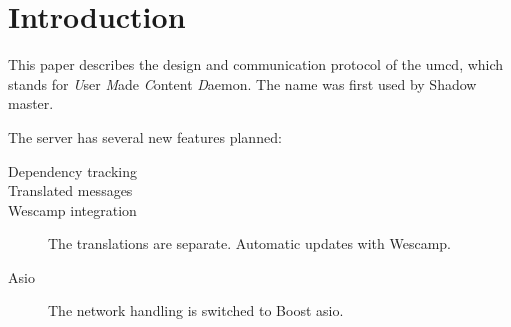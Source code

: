 \chapter{Introduction}
\label{chapter:introduction}

This paper describes the design and communication protocol of the umcd,
which stands for \emph{U}ser \emph{M}ade \emph{C}ontent \emph{D}aemon. The
name was first used by Shadow master.

The server has several new features planned:
\begin{description}
\item[Dependency tracking]


\item[Translated messages]

\item[Wescamp integration]
	The translations are separate. Automatic updates with Wescamp.

\item[Asio]
	The network handling is switched to Boost asio.

\end{description}
